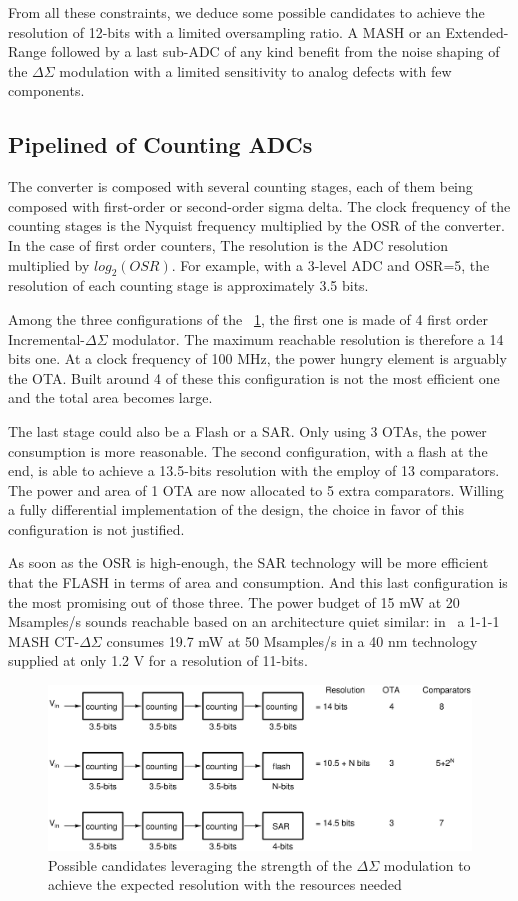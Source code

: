 From all these constraints, we deduce some possible candidates to achieve the resolution of 12-bits with a limited oversampling ratio.
A MASH or an Extended-Range followed by a last sub-ADC of any kind benefit from the noise shaping of the $\Delta\Sigma$ modulation with a limited sensitivity to analog defects with few components.

\subsection{Pipelined of Counting ADCs}
The converter is composed with several counting stages, each of them being composed with first-order or second-order sigma delta. The clock frequency of the
counting stages is the Nyquist frequency multiplied by the OSR of the converter. In the case of first order counters, The resolution is the ADC resolution multiplied by \(log_2(OSR)\). For example, with a 3-level ADC and OSR=5, the resolution of each counting stage is approximately 3.5 bits.

Among the three configurations of the \figurename~\ref{fig:counting-candidates}, the first one is made of 4 first order Incremental-\(\Delta \Sigma\) modulator. The maximum reachable resolution is therefore a 14 bits one. At a clock frequency of 100 MHz, the power hungry element is arguably the OTA\@. Built around 4 of these this configuration is not the most efficient one and the total area becomes large.

The last stage could also be a Flash or a SAR\@. Only using 3 OTAs, the power consumption is more reasonable. The second configuration, with a flash at the end, is able to achieve a 13.5-bits resolution with the employ of 13 comparators. The power and area of 1 OTA are now allocated to 5 extra comparators. Willing a fully differential implementation of the design, the choice in favor of this configuration is not justified.

As soon as the OSR is high-enough, the SAR technology will be more efficient that the FLASH in terms of area and consumption. And this last configuration is the most promising out of those three. The power budget of 15 mW at 20 Msamples/s sounds reachable based on an architecture quiet similar: in~\cite{Liu2017} a 1-1-1 MASH CT-\(\Delta\Sigma\) consumes 19.7 mW at 50 Msamples/s in a 40 nm technology supplied at only 1.2 V for a resolution of 11-bits.

\begin{figure}[htp]
	\centering
	\includegraphics[width=.9\textwidth]{Chapter4/Figs/study/counting-conversion.ps}
	\caption{Possible candidates leveraging the strength of the \(\Delta \Sigma\) modulation to achieve the expected resolution with the resources needed}
	\label{fig:counting-candidates}
\end{figure}

